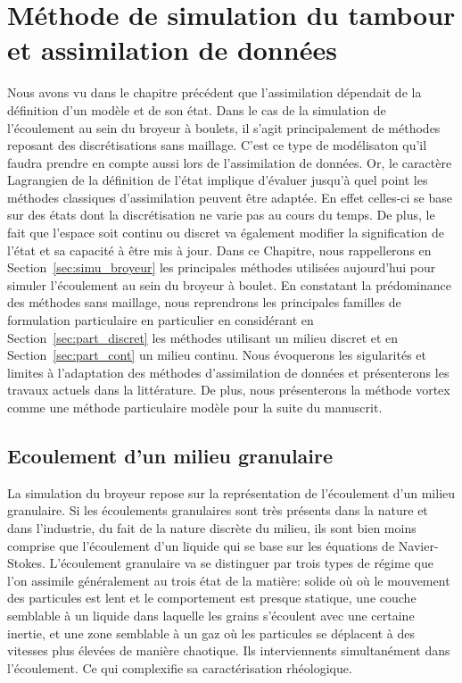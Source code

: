 
\chapter{Méthode de simulation du tambour et assimilation de données}

Nous avons vu dans le chapitre précédent que l'assimilation dépendait de la définition d'un modèle et de son état. Dans le cas de la simulation de l'écoulement au sein du broyeur à boulets, il s'agit principalement de méthodes reposant des discrétisations sans maillage. C'est ce type de modélisaton qu'il faudra prendre en compte aussi lors de l'assimilation de données. Or, le caractère Lagrangien de la définition de l'état implique d'évaluer jusqu'à quel point les méthodes classiques d'assimilation peuvent être adaptée. En effet celles-ci se base sur des états dont la discrétisation ne varie pas au cours du temps. De plus, le fait que l'espace soit continu ou discret va également modifier la signification de l'état et sa capacité à être mis à jour.
Dans ce Chapitre, nous rappellerons en Section~\ref{sec:simu_broyeur} les principales méthodes utilisées aujourd'hui pour simuler l'écoulement au sein du broyeur à boulet. En constatant la prédominance des méthodes sans maillage, nous reprendrons les principales familles de formulation particulaire en particulier en considérant en Section~\ref{sec:part_discret} les méthodes utilisant un milieu discret et en Section~\ref{sec:part_cont} un milieu continu. Nous évoquerons les sigularités et limites à l'adaptation des méthodes d'assimilation de données et présenterons les travaux actuels dans la littérature. De plus, nous présenterons la méthode vortex comme une méthode particulaire modèle pour la suite du manuscrit.

\section{Ecoulement d'un milieu granulaire}

La simulation du broyeur repose sur la représentation de l'écoulement d'un milieu granulaire. Si les écoulements granulaires sont très présents dans la nature et dans l'industrie, du fait de la nature discrète du milieu, ils sont bien moins comprise que l'écoulement d'un liquide qui se base sur les équations de Navier-Stokes.
L'écoulement granulaire va se distinguer par trois types de régime que l'on assimile généralement au trois état de la matière: solide où où le mouvement des particules est lent et le comportement est presque statique, une couche semblable à un liquide dans laquelle les grains s'écoulent avec une certaine inertie, et une zone semblable à un gaz où les particules se déplacent à des vitesses plus élevées de manière chaotique. Ils interviennents simultanément dans l'écoulement. Ce qui complexifie sa caractérisation rhéologique.

